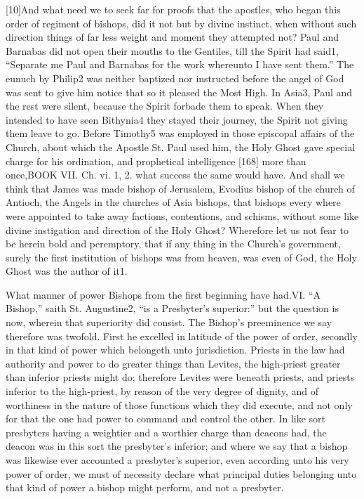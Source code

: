 [10]And what need we to seek far for proofs that the apostles, who began this order of regiment of bishops, did it not but by divine instinct, when without such direction things of far less weight and moment they attempted not? Paul and Barnabas did not open their mouths to the Gentiles, till the Spirit had said1, “Separate me Paul and Barnabas for the work whereunto I have sent them.” The eunuch by Philip2 was neither baptized nor instructed before the angel of God was sent to give him notice that so it pleased the Most High. In Asia3, Paul and the rest were silent, because the Spirit forbade them to speak. When they intended to have seen Bithynia4 they stayed their journey, the Spirit not giving them leave to go. Before Timothy5 was employed in those episcopal affairs of the Church, about which the Apostle St. Paul used him, the Holy Ghost gave special charge for his ordination, and prophetical intelligence [168] more than once,BOOK VII. Ch. vi. 1, 2. what success the same would have. And shall we think that James was made bishop of Jerusalem, Evodius bishop of the church of Antioch, the Angels in the churches of Asia bishops, that bishops every where were appointed to take away factions, contentions, and schisms, without some like divine instigation and direction of the Holy Ghost? Wherefore let us not fear to be herein bold and peremptory, that if any thing in the Church’s government, surely the first institution of bishops was from heaven, was even of God, the Holy Ghost was the author of it1.

What manner of power Bishops from the first beginning have had.VI. “A Bishop,” saith St. Augustine2, “is a Presbyter’s superior:” but the question is now, wherein that superiority did consist. The Bishop’s preeminence we say therefore was twofold. First he excelled in latitude of the power of order, secondly in that kind of power which belongeth unto jurisdiction. Priests in the law had authority and power to do greater things than Levites, the high-priest greater than inferior priests might do; therefore Levites were beneath priests, and priests inferior to the high-priest, by reason of the very degree of dignity, and of worthiness in the nature of those functions which they did execute, and not only for that the one had power to command and control the other. In like sort presbyters having a weightier and a worthier charge than deacons had, the deacon was in this sort the presbyter’s inferior; and where we say that a bishop was likewise ever accounted a presbyter’s superior, even according unto his very power of order, we must of necessity declare what principal duties belonging unto that kind of power a bishop might perform, and not a presbyter.

